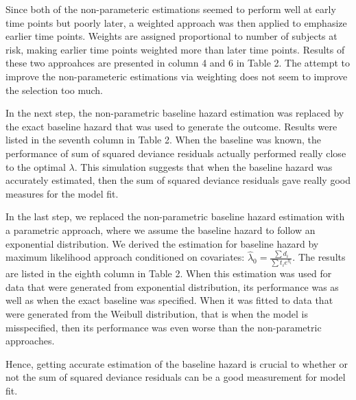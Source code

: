 \par Since both of the non-parameteric estimations seemed to perform well at early time points but poorly later, a weighted approach was then applied to emphasize earlier time points. Weights are assigned proportional to number of subjects at risk, making earlier time points weighted more than later time points. Results of these two approahces are presented in column 4 and 6 in Table 2. The attempt to improve the non-parameteric estimations via weighting does not seem to improve the selection too much. 

\par In the next step,  the non-parametric baseline hazard estimation was replaced by the exact baseline hazard that was used to generate the outcome. Results were listed in the seventh column in Table 2. When the baseline was known, the performance of sum of squared deviance residuals actually performed really close to the optimal $\lambda$. This simulation suggests that when the baseline hazard was accurately estimated, then the sum of squared deviance residuals gave really good measures for the model fit.

\par In the last step, we replaced the non-parametric baseline hazard estimation with a parametric approach, where we assume the baseline hazard to follow an exponential distribution. We derived the estimation for baseline hazard by maximum likelihood approach conditioned on covariates: $\hat{\lambda}_{0} = \frac{\sum d_{i}}{\sum t_{i}e^{\eta_{i}}}$. The results are listed in the eighth column in Table 2. When this estimation was used for data that were generated from exponential distribution, its performance was as well as when the exact baseline was specified. When it was fitted to data that were generated from the Weibull distribution, that is when the model is misspecified, then its performance was even worse than the non-parametric approaches.

\par Hence, getting accurate estimation of the baseline hazard is crucial to whether or not the sum of squared deviance residuals can be a good measurement for model fit.


